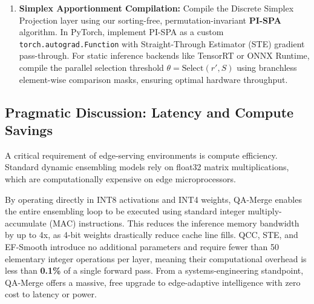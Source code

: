 \documentclass{article}
\theoremstyle{plain}
\theoremstyle{definition}
\theoremstyle{remark}
\begin{document}
\begin{enumerate}
    \item \textbf{Simplex Apportionment Compilation:} Compile the Discrete Simplex Projection layer using our sorting-free, permutation-invariant \textbf{PI-SPA} algorithm. In PyTorch, implement PI-SPA as a custom \texttt{torch.autograd.Function} with Straight-Through Estimator (STE) gradient pass-through. For static inference backends like TensorRT or ONNX Runtime, compile the parallel selection threshold $\theta = \text{Select}(r', S)$ using branchless element-wise comparison masks, ensuring optimal hardware throughput.
\end{enumerate}

\subsection{Pragmatic Discussion: Latency and Compute Savings}
A critical requirement of edge-serving environments is compute efficiency. Standard dynamic ensembling models rely on float32 matrix multiplications, which are computationally expensive on edge microprocessors. 

By operating directly in INT8 activations and INT4 weights, QA-Merge enables the entire ensembling loop to be executed using standard integer multiply-accumulate (MAC) instructions. This reduces the inference memory bandwidth by up to 4x, as 4-bit weights drastically reduce cache line fills. QCC, STE, and EF-Smooth introduce no additional parameters and require fewer than 50 elementary integer operations per layer, meaning their computational overhead is less than \textbf{0.1\%} of a single forward pass. From a systems-engineering standpoint, QA-Merge offers a massive, free upgrade to edge-adaptive intelligence with zero cost to latency or power.
\end{document}
